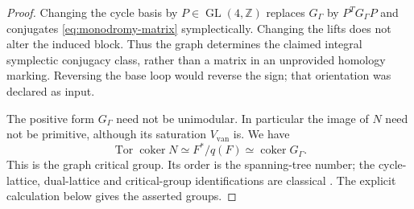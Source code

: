 \begin{proof}
Changing the cycle basis by
$P\in\operatorname{GL}(4,\mathbb Z)$
replaces $G_\Gamma$ by $P^TG_\Gamma P$
and conjugates \eqref{eq:monodromy-matrix}
symplectically. Changing the lifts
does not alter the induced block.
Thus the graph determines the
claimed integral symplectic
conjugacy class, rather than a
matrix in an unprovided homology
marking. Reversing the base loop
would reverse the sign; that
orientation was declared as input.

The positive form $G_\Gamma$ need
not be unimodular. In particular
the image of $N$ need not be
primitive, although its saturation
$V_{\mathrm{van}}$ is. We have
\[
 \operatorname{Tor}\operatorname{coker}N
       \simeq F^*/q(F)
       \simeq\operatorname{coker}G_\Gamma.
\]
This is the graph critical group.
Its order is the spanning-tree
number; the cycle-lattice,
dual-lattice and critical-group
identifications are classical
\cite[Propositions~1, 3 and 7,
and Lemma~2]{bacher-harpe-nagnibeda}.
The explicit calculation below
gives the asserted groups.
\end{proof}

